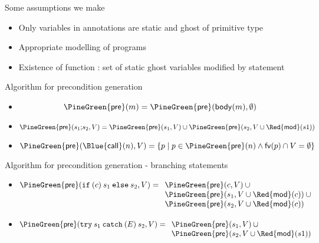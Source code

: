 \documentclass[final,nocolorBG,a4,marieke,nototal,ps, accumulate,slideColor]{prosper}
\begin{document}
\begin{slide}{Some assumptions we make}
\begin{itemize}
  \item Only variables in annotations are static and ghost of primitive type
  \item Appropriate modelling of programs
  \item Existence of function {\large\textsf{}}: set of static ghost
variables modified by statement 
\end{itemize}
\end{slide}

\begin{slide}{Algorithm for precondition generation}
\begin{itemize}
   \item {}
\[\mathsf{\PineGreen{pre}}(m)  =  \mathsf{\PineGreen{pre}}(\mathsf{body}(m), \emptyset)\]
   \item {}
\[\mathsf{\PineGreen{pre}}(s_1 \mathtt{;} s_2, V)  =  \mathsf{\PineGreen{pre}}(s_1, V) \cup 
                                          \mathsf{\PineGreen{pre}}(s_2, V \cup
\mathsf{\Red{mod}}(s1))\]
   \item {}
\[\mathsf{\PineGreen{pre}}(\mathsf{\Blue{call}}(n),V)  =  
                \{ p \mid p \in \mathsf{\PineGreen{pre}}(n) \wedge 
                          \mathsf{fv}(p) \cap V = \emptyset\}\]
\end{itemize}
\end{slide}

\begin{slide}{Algorithm for precondition generation - branching statements}
\begin{itemize}
   \item {}
\[
\mathsf{\PineGreen{pre}}(\mathtt{if\:(} c \mathtt{)\:} s_1 \mathtt{\:else\:} s_2,
V)  = 
\begin{array}[t]{l}
   \mathsf{\PineGreen{pre}}(c, V) \:\cup \\
   \mathsf{\PineGreen{pre}}(s_1, V \cup \mathsf{\Red{mod}}(c)) \:\cup\\
   \mathsf{\PineGreen{pre}}(s_2, V \cup \mathsf{\Red{mod}}(c))
\end{array}\]
\item {}
\[\mathsf{\PineGreen{pre}}(\mathtt{try\:} s_1 \mathtt{\:catch\:(} E \mathtt{)\:} s_2, V)  =  \begin{array}[t]{l}
   \mathsf{\PineGreen{pre}}(s_1, V) \:\cup \\
   \mathsf{\PineGreen{pre}}(s_2, V \cup \mathsf{\Red{mod}}(s1))
  \end{array}\]
\end{itemize}
\end{slide}
\end{document}
